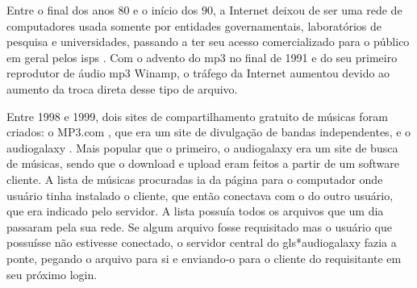 



Entre o final dos anos 80 e o início dos 90, a Internet deixou de ser uma rede de
computadores usada somente por entidades governamentais, laboratórios de pesquisa e
universidades, passando a ter seu acesso comercializado para o público em geral pelos
\glspl{isp} \cite{site:wiki-isp}. Com o advento do \gls{mp3} \cite{site:wiki-mp3} no
final de 1991  e do seu
primeiro reprodutor de áudio \gls*{mp3} Winamp, o tráfego da Internet aumentou devido
ao aumento da troca direta desse tipo de arquivo.

Entre 1998 e 1999, dois sites de compartilhamento gratuito de músicas foram criados: o
MP3.com \cite{site:wiki-mp3.com}, que era um site de divulgação de bandas independentes,
e o \gls{audiogalaxy} \cite{site:wiki-audiogalaxy.com,revista:pnp}. Mais popular que o
primeiro, o \gls*{audiogalaxy} era um site de busca de músicas, sendo que o download e
upload eram feitos a partir de um software cliente. A lista de músicas procuradas ia da
página para o computador onde usuário tinha instalado o cliente, que então conectava
com o do outro usuário, que era indicado pelo servidor. A lista possuía todos os
arquivos que um dia passaram pela sua rede. Se algum arquivo fosse requisitado mas o
usuário que possuísse não estivesse conectado, o servidor central do gls*{audiogalaxy}
fazia a ponte, pegando o arquivo para si e enviando-o para o cliente do requisitante em
seu próximo login.


